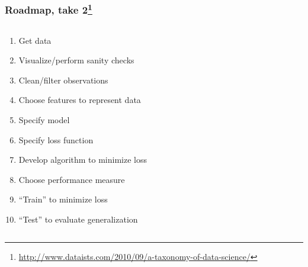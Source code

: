 \documentclass[xcolor=dvipsnames, 9pt]{beamer}
\begin{document}
\begin{frame}
  \frametitle{Roadmap, take 2\footnote{\url{http://www.dataists.com/2010/09/a-taxonomy-of-data-science/}}}

  \begin{columns}
    \begin{column}{0.6\textwidth}
      
  \begin{enumerate}
    \item Get data
    \item Visualize/perform sanity checks
    \item Clean/filter observations
    \item Choose features to represent data
    \item Specify model
    \item Specify loss function 
    \item Develop algorithm to minimize loss 
    \item Choose performance measure
    \item ``Train'' to minimize loss
    \item ``Test'' to evaluate generalization
  \end{enumerate}

    \end{column}
    \begin{column}{0.3\textwidth}


\end{column}
\end{columns}
\end{frame}
\end{document}
